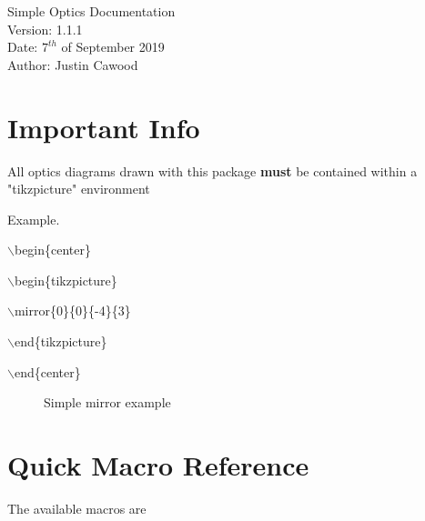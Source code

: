 \documentclass[12pt]{article}
\begin{document}
\begin{titlepage}
\vspace*{\fill}
\begin{center}
{\Huge Simple Optics Documentation}\\[0.5cm]
{\Large Version: 1.1.1}\\[0.4cm]
{\Large Date: $7^{th}$ of September 2019}\\[0.2cm]
{\small Author: Justin Cawood}
\end{center}
\vspace*{\fill}
\end{titlepage}

\newpage

\tableofcontents

\newpage

\section{Important Info}

All optics diagrams drawn with this package \textbf{must} be contained within a "tikzpicture" environment

Example.

$\backslash$begin\{center\}

$\backslash$begin\{tikzpicture\}

$\backslash$mirror\{0\}\{0\}\{-4\}\{3\}

$\backslash$end\{tikzpicture\}

$\backslash$end\{center\}

\begin{figure}[H]

\begin{center}


\end{center}

\caption{Simple mirror example}
\end{figure}

\section{Quick Macro Reference}

The available macros are
\end{document}
